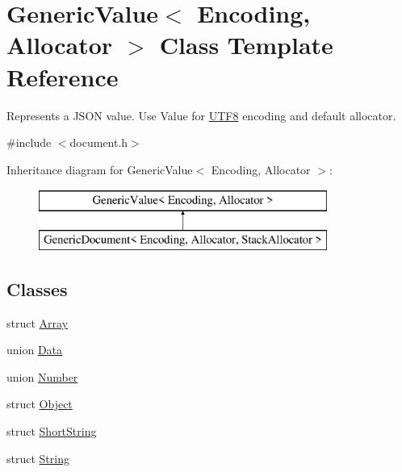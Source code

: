 \hypertarget{class_generic_value}{}\section{Generic\+Value$<$ Encoding, Allocator $>$ Class Template Reference}
\label{class_generic_value}


Represents a J\+S\+ON value. Use Value for \hyperlink{struct_u_t_f8}{U\+T\+F8} encoding and default allocator.  




{\ttfamily \#include $<$document.\+h$>$}

Inheritance diagram for Generic\+Value$<$ Encoding, Allocator $>$\+:\begin{figure}[H]
\begin{center}
\leavevmode
\includegraphics[height=2.000000cm]{class_generic_value}
\end{center}
\end{figure}
\subsection*{Classes}
\begin{DoxyCompactItemize}
\item 
struct \hyperlink{struct_generic_value_1_1_array}{Array}
\item 
union \hyperlink{union_generic_value_1_1_data}{Data}
\item 
union \hyperlink{union_generic_value_1_1_number}{Number}
\item 
struct \hyperlink{struct_generic_value_1_1_object}{Object}
\item 
struct \hyperlink{struct_generic_value_1_1_short_string}{Short\+String}
\item 
struct \hyperlink{struct_generic_value_1_1_string}{String}
\end{DoxyCompactItemize}
